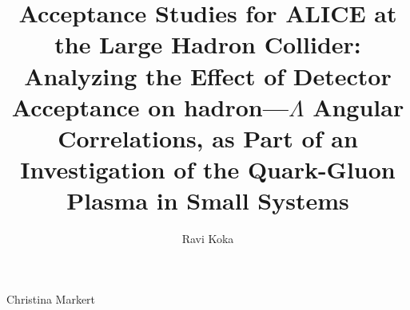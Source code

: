 \author{Ravi Koka}  	%


\title{Acceptance Studies for ALICE at the Large Hadron Collider: Analyzing the Effect of Detector Acceptance on hadron---$\Lambda$ Angular Correlations, as Part of an Investigation of the Quark-Gluon Plasma in Small Systems} %


%
%
%
%
%
%
\supervisor
	{Christina Markert}

%
%
%
%
%
%


